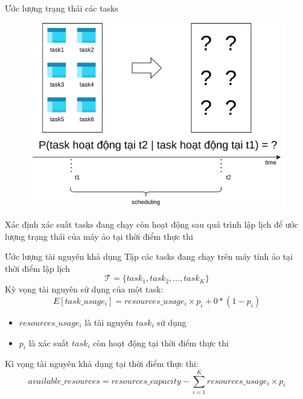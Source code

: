 \documentclass[11pt,xcolor={dvipsnames}, aspectratio=169]{beamer}
\begin{document}
\begin{frame}
{Ước lượng trạng thái các tasks}
\begin{figure}
	\centering
	\includegraphics[scale=0.5]{images/predicting_status3.png}
\end{figure}
\begin{center}
	\large{Xác định xác suất tasks đang chạy còn hoạt động sau quá trình lập lịch để ước lượng trạng thái của máy ảo tại thời điểm thực thi}
\end{center}
\end{frame}

\begin{frame}
{Ước lượng tài nguyên khả dụng}
\pause
{Tập các tasks đang chạy trên máy tính ảo tại thời điểm lập lịch}
\[
	\mathcal{T} = \{task_{1}, task_{2}, ..., task_{K}\}
\]
Kỳ vọng tài nguyên sử dụng của một task: 
\begin{equation}
	E[task\_usage_{i}] = resources\_usage_{i} \times p_{i} + 0 * (1 - p_{i})
\end{equation}
\begin{itemize}
	\item $resources\_usage_{i}$ là tài nguyên $task_{i}$ sử dụng 
	\item $p_{i}$ là xác suất $task_{i}$ còn hoạt động tại thời điểm thực thi
\end{itemize}
Kì vọng tài nguyên khả dụng tại thời điểm thực thi: 
\begin{equation}
	available\_resources = resources\_capacity - \sum_{i = 1}^{K}{resources\_usage_{i} \times p_{i}}
\end{equation}
\end{frame}
\end{document}
